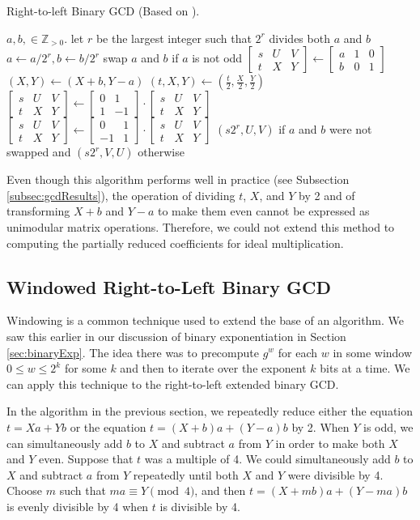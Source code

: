 \documentclass{ucalgthes1}
\theoremstyle{definition}
\newcommand{\ZZgtz}{\mathbb{Z}_{>0}}
\newcommand{\matrixtt}[4]{\left[ \begin{array}{rr} #1 & #2 \\ #3 & #4 \end{array} \right]}
\newcommand{\matrixThreeTwo}[6]{\left[ \begin{array}{rrr} #1 & #2 & #3 \\ #4 & #5 & #6 \end{array} \right]}
\begin{document}
\begin{algorithm}[h]
\caption{Right-to-left Binary GCD (Based on \cite{Stein1967}).}
\label{alg:r2lBinGcd}
\begin{algorithmic}[1]
\REQUIRE $a,b, \in \ZZgtz$.
\STATE let $r$ be the largest integer such that $2^r$ divides both $a$ and $b$
\STATE $a \gets a / 2^r, b \gets b / 2^r$
\STATE swap $a$ and $b$ if $a$ is not odd
\STATE $\matrixThreeTwo{s}{U}{V}{t}{X}{Y} \gets \matrixThreeTwo{a}{1}{0}{b}{0}{1}$
			\STATE $(X, Y) \gets (X+b, Y-a)$
		\ENDIF
		\STATE $(t, X, Y) \gets \left( \frac{t}{2}, \frac{X}{2}, \frac{Y}{2} \right)$
	\ENDWHILE
		\STATE $\matrixThreeTwo{s}{U}{V}{t}{X}{Y} \gets \matrixtt{0}{1}{1}{-1} \cdot \matrixThreeTwo{s}{U}{V}{t}{X}{Y}$
	\ELSE
		\STATE $\matrixThreeTwo{s}{U}{V}{t}{X}{Y} \gets \matrixtt{0}{1}{-1}{1} \cdot \matrixThreeTwo{s}{U}{V}{t}{X}{Y}$
	\ENDIF
\ENDWHILE
\RETURN $(s2^r, U, V)$ if $a$ and $b$ were not swapped and $(s2^r, V, U)$ otherwise
\end{algorithmic}
\end{algorithm}

Even though this algorithm performs well in practice (see Subsection \ref{subsec:gcdResults}), the operation of dividing $t$, $X$, and $Y$ by 2 and of transforming $X+b$ and $Y-a$ to make them even cannot be expressed as unimodular matrix operations.  Therefore, we could not extend this method to computing the partially reduced coefficients for ideal multiplication.

\subsection{Windowed Right-to-Left Binary GCD}

Windowing is a common technique used to extend the base of an algorithm.  We saw this earlier in our discussion of binary exponentiation in Section \ref{sec:binaryExp}.  The idea there was to precompute $g^w$ for each $w$ in some window $0 \le w \le 2^k$ for some $k$ and then to iterate over the exponent $k$ bits at a time.  We can apply this technique to the right-to-left extended binary GCD.

In the algorithm in the previous section, we repeatedly reduce either the equation $t=Xa+Yb$ or the equation $t=(X+b)a+(Y-a)b$ by 2. When $Y$ is odd, we can simultaneously add $b$ to $X$ and subtract $a$ from $Y$ in order to make both $X$ and $Y$ even.  Suppose that $t$ was a multiple of 4.  We could simultaneously add $b$ to $X$ and subtract $a$ from $Y$ repeatedly until both $X$ and $Y$ were divisible by 4.  Choose $m$ such that $ma \equiv Y \pmod 4$, and then $t = (X+mb)a + (Y-ma)b$ is evenly divisible by 4 when $t$ is divisible by 4.
\end{document}

